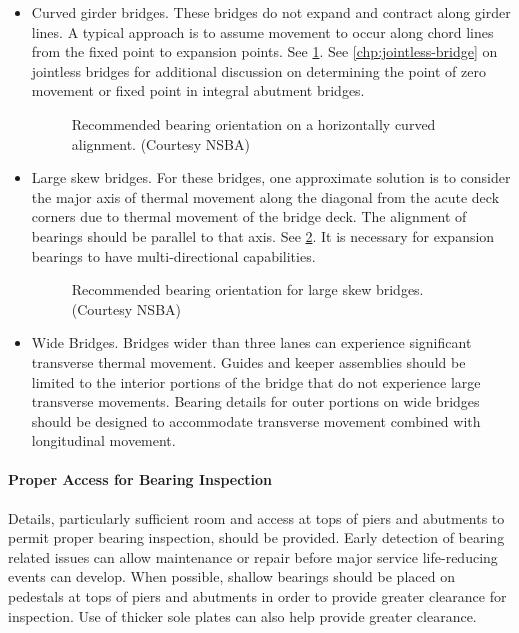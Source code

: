 \begin{itemize}
  \item Curved girder bridges. These bridges do not expand and contract along girder lines. A typical approach is
  to assume movement to occur along chord lines from the fixed point to expansion points. See \cref{fig:bearing-orientation-curved}. See \cref{chp:jointless-bridge} on jointless bridges for additional discussion on determining the point of zero movement or
  fixed point in integral abutment bridges.

  \begin{figure}
    \caption{Recommended bearing orientation on a horizontally curved alignment. (Courtesy NSBA)}\label{fig:bearing-orientation-curved}
  \end{figure}
  \item Large skew bridges. For these bridges, one approximate solution is to consider the major axis of thermal
  movement along the diagonal from the acute deck corners due to thermal movement of the bridge deck. The
  alignment of bearings should be parallel to that axis. See \cref{fig:bearing-orientation-skew}. It is necessary for expansion
  bearings to have multi-directional capabilities.
  
  \begin{figure}
    \caption{Recommended bearing orientation for large skew bridges. (Courtesy NSBA)}\label{fig:bearing-orientation-skew}
  \end{figure}
  \item Wide Bridges. Bridges wider than three lanes can experience significant transverse thermal movement.
Guides and keeper assemblies should be limited to the interior portions of the bridge that do not experience
large transverse movements. Bearing details for outer portions on wide bridges should be designed to
accommodate transverse movement combined with longitudinal movement.
\end{itemize}

\paragraph{Proper Access for Bearing Inspection}
Details, particularly sufficient room and access at tops of piers and abutments to permit proper bearing
inspection, should be provided. Early detection of bearing related issues can allow maintenance or repair before
major service life-reducing events can develop. When possible, shallow bearings should be placed on pedestals at tops of piers and abutments in order to provide greater clearance for inspection. Use of thicker sole plates can also
help provide greater clearance.


